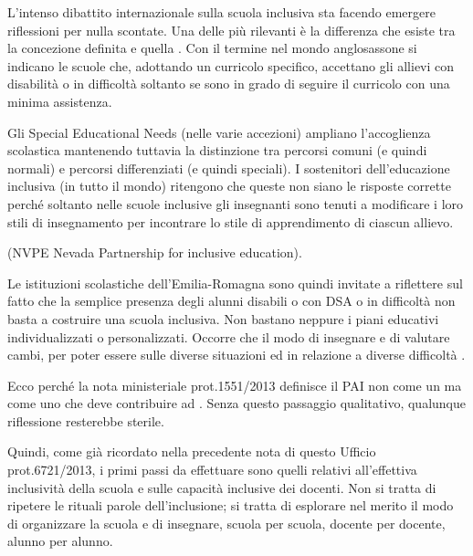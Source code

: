 \begin{description}
\begin{enumerate}
		L'intenso dibattito internazionale sulla scuola inclusiva sta facendo emergere riflessioni per nulla
		scontate. Una delle più rilevanti è la differenza che esiste tra la concezione definita 
		e quella . Con il termine  nel mondo anglosassone si indicano le scuole che,
		adottando un curricolo specifico, accettano gli allievi con disabilità o in difficoltà soltanto se sono in
		grado di seguire il curricolo con una minima assistenza.
		
		Gli {\foreignlanguage{english}Special Educational Needs} (nelle varie accezioni) ampliano l'accoglienza scolastica mantenendo
		tuttavia la distinzione tra percorsi comuni (e quindi normali) e percorsi differenziati (e quindi speciali).
		I sostenitori dell'educazione inclusiva (in tutto il mondo) ritengono che queste non siano le risposte
		corrette perché soltanto nelle scuole inclusive gli insegnanti sono tenuti a modificare i loro stili di
		insegnamento per incontrare lo stile di apprendimento di ciascun allievo.\begin{otherlanguage}{english}
		 (NVPE Nevada Partnership for inclusive education).
		\end{otherlanguage} 
		
		Le istituzioni scolastiche dell'Emilia-Romagna sono quindi invitate a riflettere sul fatto che la semplice
		presenza degli alunni disabili o con DSA o in difficoltà non basta a costruire una scuola inclusiva. Non
		bastano neppure i piani educativi individualizzati o personalizzati. Occorre che il modo di insegnare e
		di valutare cambi, per poter essere  sulle diverse situazioni ed in relazione a diverse difficoltà .
		
		Ecco perché la nota ministeriale prot.1551/2013 definisce il PAI non come un  ma come
		uno  che deve contribuire ad .
		Senza questo passaggio qualitativo, qualunque riflessione resterebbe sterile.
		
		Quindi, come già ricordato nella precedente nota di questo Ufficio prot.6721/2013, i primi passi da
		effettuare sono quelli relativi all'effettiva inclusività della scuola e sulle capacità inclusive dei docenti.
		Non si tratta di ripetere le rituali parole dell'inclusione; si tratta di esplorare nel merito il modo di
		organizzare la scuola e di insegnare, scuola per scuola, docente per docente, alunno per alunno.
		

\end{enumerate}
\end{description}
